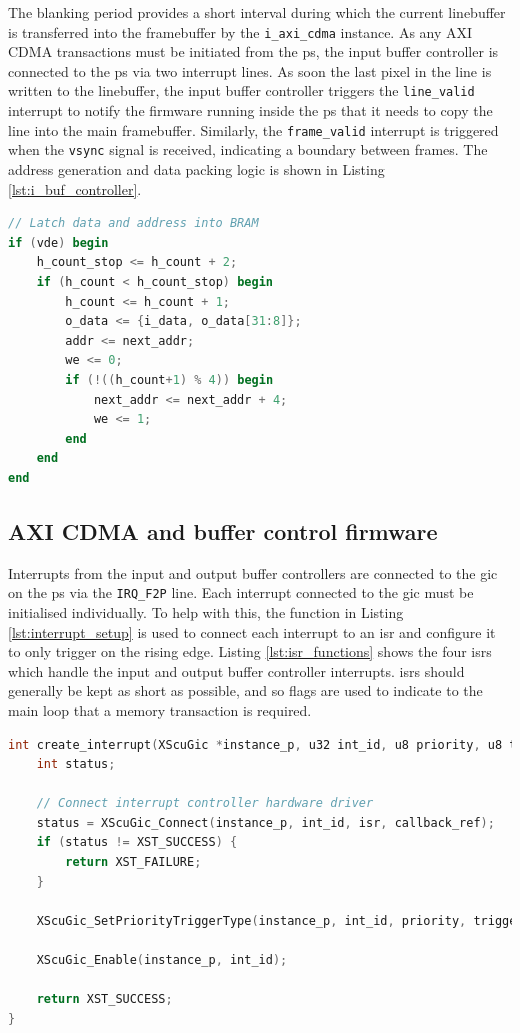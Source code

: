 The blanking period provides a short interval during which the current linebuffer is transferred into the framebuffer by the \texttt{i\_axi\_cdma} instance. As any AXI CDMA transactions must be initiated from the \gls{ps}, the input buffer controller is connected to the \gls{ps} via two interrupt lines. As soon the last pixel in the line is written to the linebuffer, the input buffer controller triggers the \texttt{line\_valid} interrupt to notify the firmware running inside the \gls{ps} that it needs to copy the line into the main framebuffer. Similarly, the \texttt{frame\_valid} interrupt is triggered when the \texttt{vsync} signal is received, indicating a boundary between frames. The address generation and data packing logic is shown in Listing \ref{lst:i_buf_controller}.

\begin{lstlisting}[caption={Address generation and data packing logic for input framebuffer.}, label={lst:i_buf_controller}, language=Verilog]
// Latch data and address into BRAM
if (vde) begin
    h_count_stop <= h_count + 2;
    if (h_count < h_count_stop) begin
        h_count <= h_count + 1;
        o_data <= {i_data, o_data[31:8]};
        addr <= next_addr;
        we <= 0;
        if (!((h_count+1) % 4)) begin
            next_addr <= next_addr + 4;
            we <= 1;
        end
    end
end
\end{lstlisting}

\subsection{AXI CDMA and buffer control firmware}
Interrupts from the input and output buffer controllers are connected to the \gls{gic} on the \gls{ps} via the \texttt{IRQ\_F2P} line. Each interrupt connected to the \gls{gic} must be initialised individually. To help with this, the function in Listing \ref{lst:interrupt_setup} is used to connect each interrupt to an \gls{isr} and configure it to only trigger on the rising edge. Listing \ref{lst:isr_functions} shows the four \glspl{isr} which handle the input and output buffer controller interrupts. \glspl{isr} should generally be kept as short as possible, and so flags are used to indicate to the main loop that a memory transaction is required.

\begin{lstlisting}[caption={Interrupt setup function}, label={lst:interrupt_setup}, language=C]
int create_interrupt(XScuGic *instance_p, u32 int_id, u8 priority, u8 trigger, Xil_InterruptHandler isr, void *callback_ref) {
    int status;

    // Connect interrupt controller hardware driver
    status = XScuGic_Connect(instance_p, int_id, isr, callback_ref);
    if (status != XST_SUCCESS) {
        return XST_FAILURE;
    }

    XScuGic_SetPriorityTriggerType(instance_p, int_id, priority, trigger);

    XScuGic_Enable(instance_p, int_id);

    return XST_SUCCESS;
}
\end{lstlisting}

